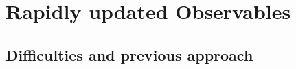 
\section{Rapidly updated Observables}
\label{sec:RapidlyUpdatedObservables}
	
	\subsection{Difficulties and previous approach}
	
